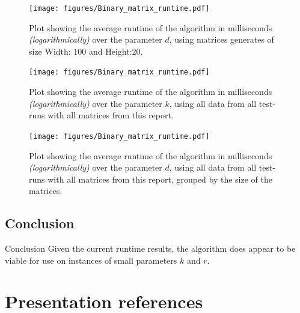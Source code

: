 \documentclass{beamer}
\begin{document}
\begin{frame}
  \begin{figure}
    \centering
    \texttt{[image: figures/Binary\_matrix\_runtime.pdf]}
    \caption{Plot showing the average runtime of the algorithm in milliseconds \textit{(logarithmically)}
      over the parameter $d$, using matrices generates of size Width: $100$ and Height:$20$.}
  \end{figure}
\end{frame}

\begin{frame}
  \begin{figure}
    \centering
    \texttt{[image: figures/Binary\_matrix\_runtime.pdf]}
    \caption{Plot showing the average runtime of the algorithm in milliseconds \textit{(logarithmically)}
      over the parameter $k$, using all data from all test-runs with all matrices from this report.}
  \end{figure}
\end{frame}

\begin{frame}
  \begin{figure}
    \centering
    \texttt{[image: figures/Binary\_matrix\_runtime.pdf]}
    \caption{Plot showing the average runtime of the algorithm in milliseconds \textit{(logarithmically)}
      over the parameter $d$, using all data from all test-runs with all matrices from this report, grouped by
      the size of the matrices.}
  \end{figure}
\end{frame}


\subsection{Conclusion}
\begin{frame}
  \begin{block}{Conclusion}
    Given the current runtime results, the algorithm does appear to be viable for use on instances 
    of small parameters $k$ and $r$.
  \end{block}
\end{frame}

\section{Presentation references}

\end{document}
